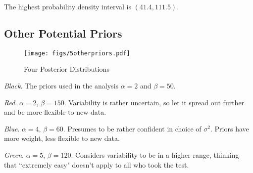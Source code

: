 \documentclass[12pt]{article}
\begin{document}
The highest probability density interval is $(41.4, 111.5)$.

\subsection{Other Potential Priors}

\begin{figure}[H]
\begin{center}
\texttt{[image: figs/5otherpriors.pdf]}
\caption{Four Posterior Distributions}
\end{center}
\end{figure}

\noindent \textit{Black}.  The priors used in the analysis $\alpha=2$ and $\beta=50$.

\noindent \textit{Red}. $\alpha=2$, $\beta=150$.  Variability is rather uncertain, so let it spread out further and be more flexible to new data.

\noindent \textit{Blue}. $\alpha=4$, $\beta=60$.  Presumes to be rather confident in choice of $\sigma^2$.  Priors have more weight, less flexible to new data.

\noindent \textit{Green}. $\alpha=5$, $\beta=120$.  Considers variability to be in a higher range, thinking that ``extremely easy" doesn't apply to all who took the test.

%
\end{document}
